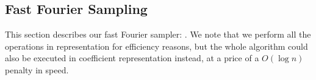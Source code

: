
%



 \subsection{Fast Fourier Sampling}

 This section describes our fast Fourier sampler: \longffsampling. We note that we perform all the operations in \fft representation for efficiency reasons, but the whole algorithm could also be executed in coefficient representation instead, at a price of a $O(\log n)$ penalty in speed.


